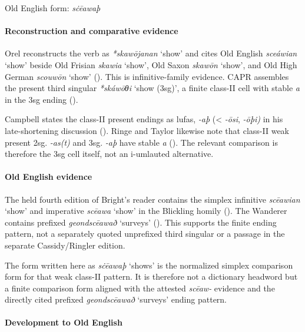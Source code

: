 \documentclass[
  british,
  a4paper,
]{article}
\providecommand{\Recon}[1]{\emph{*#1}}
\begin{document}
Old English form: \emph{sċēawaþ}

\paragraph{Reconstruction and comparative
evidence}\label{reconstruction-and-comparative-evidence-143}

Orel reconstructs the verb as \Recon{skawōjanan} `show' and cites Old
English {\emph{sceáwian}} `show' beside Old Frisian {\emph{skawia}}
`show', Old Saxon {\emph{skawōn}} `show', and Old High German
{\emph{scouwōn}} `show' (). This
is infinitive-family evidence. CAPR assembles the present third singular
\Recon{skáwōθi} `show (3sg)', a finite class-II cell with stable
\emph{a} in the 3sg ending ().

Campbell states the class-II present endings as lufas, \emph{-aþ}
(\textless{} \emph{-ōsi}, \emph{-ōþi)} in his late-shortening discussion
(). Ringe and Taylor
likewise note that class-II weak present 2sg. \emph{-as(t)} and 3sg.
\emph{-aþ} have stable \emph{a} (). The relevant comparison is therefore the 3sg cell
itself, not an i-umlauted alternative.

\paragraph{Old English evidence}\label{old-english-evidence-145}

The held fourth edition of Bright's reader contains the simplex
infinitive {\emph{scēawian}} `show' and imperative {\emph{scēawa}}
`show' in the Blickling homily (). The Wanderer contains prefixed \emph{geondscēawað} `surveys'
(). This supports the finite
ending pattern, not a separately quoted unprefixed third singular or a
passage in the separate Cassidy/Ringler edition.

The form written here as {\emph{sċēawaþ}} `shows' is the normalized
simplex comparison form for that weak class-II pattern. It is therefore
not a dictionary headword but a finite comparison form aligned with the
attested \emph{scēaw-} evidence and the directly cited prefixed
\emph{geondscēawað} `surveys' ending pattern.

\paragraph{Development to Old
English}\label{development-to-old-english-144}
\end{document}
